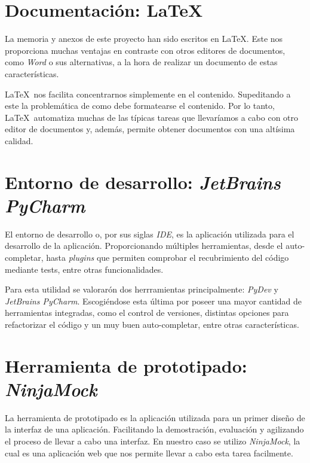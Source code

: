 \section{Documentación: \LaTeX}

La memoria y anexos de este proyecto han sido escritos en \LaTeX. Este nos proporciona muchas ventajas en contraste con otros editores de documentos, como \textit{Word} o sus alternativas, a la hora de realizar un documento de estas características.

\LaTeX\ nos facilita concentrarnos simplemente en el contenido. Supeditando a este la problemática de como debe formatearse el contenido. Por lo tanto, \LaTeX\ automatiza muchas de las típicas tareas que llevaríamos a cabo con otro editor de documentos y, además, permite obtener documentos con una altísima calidad.

\section{Entorno de desarrollo: \textit{JetBrains PyCharm}}

El entorno de desarrollo o, por sus siglas \textit{IDE}, es la aplicación utilizada para el desarrollo de la aplicación. Proporcionando múltiples herramientas, desde el auto-completar, hasta \textit{plugins} que permiten comprobar el recubrimiento del código mediante tests, entre otras funcionalidades.

Para esta utilidad se valorarón dos herrramientas principalmente: \textit{PyDev} y \textit{JetBrains PyCharm}. Escogiéndose esta última por poseer una mayor cantidad de herramientas integradas, como el control de versiones, distintas opciones para refactorizar el código y un muy buen auto-completar, entre otras características.

\section{Herramienta de prototipado: \textit{NinjaMock}}

La herramienta de prototipado es la aplicación utilizada para un primer diseño de la interfaz de una aplicación. Facilitando la demostración, evaluación y agilizando el proceso de llevar a cabo una interfaz. En nuestro caso se utilizo \textit{NinjaMock}, la cual es una aplicación web que nos permite llevar a cabo esta tarea facilmente.